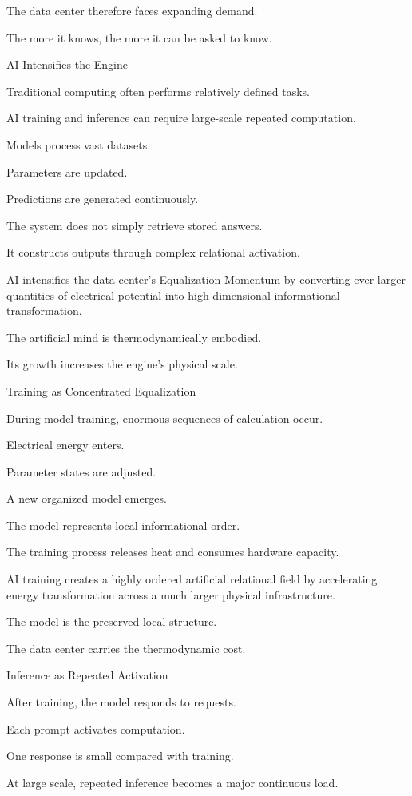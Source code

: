 The data center therefore faces expanding demand.

The more it knows, the more it can be asked to know.

AI Intensifies the Engine

Traditional computing often performs relatively defined tasks.

AI training and inference can require large-scale repeated computation.

Models process vast datasets.

Parameters are updated.

Predictions are generated continuously.

The system does not simply retrieve stored answers.

It constructs outputs through complex relational activation.

AI intensifies the data center’s Equalization Momentum by converting ever larger quantities of electrical potential into high-dimensional informational transformation.

The artificial mind is thermodynamically embodied.

Its growth increases the engine’s physical scale.

Training as Concentrated Equalization

During model training, enormous sequences of calculation occur.

Electrical energy enters.

Parameter states are adjusted.

A new organized model emerges.

The model represents local informational order.

The training process releases heat and consumes hardware capacity.

AI training creates a highly ordered artificial relational field by accelerating energy transformation across a much larger physical infrastructure.

The model is the preserved local structure.

The data center carries the thermodynamic cost.

Inference as Repeated Activation

After training, the model responds to requests.

Each prompt activates computation.

One response is small compared with training.

At large scale, repeated inference becomes a major continuous load.

